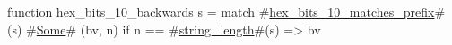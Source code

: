 function hex_bits_10_backwards s =
  match #\hyperref[sailRISCVzhexzybitszy10zymatcheszyprefix]{hex\_bits\_10\_matches\_prefix}#(s) {
      #\hyperref[sailRISCVzSome]{Some}# (bv, n) if n == #\hyperref[sailRISCVzstringzylength]{string\_length}#(s) => bv
  }

